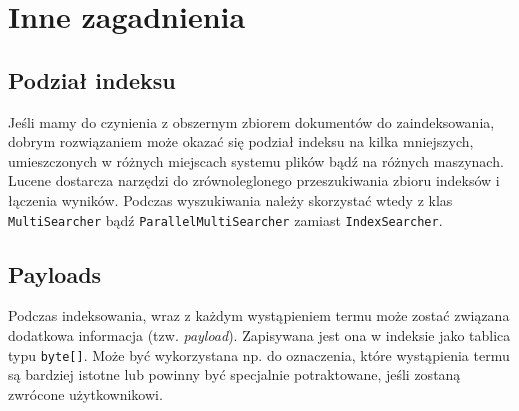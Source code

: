 \chapter{Inne zagadnienia}

\section{Podział indeksu}

Jeśli mamy do czynienia z obszernym zbiorem dokumentów do zaindeksowania, dobrym rozwiązaniem może okazać się podział indeksu na kilka mniejszych, umieszczonych w różnych miejscach systemu plików bądź na różnych maszynach. Lucene dostarcza narzędzi do zrównoleglonego przeszukiwania zbioru indeksów i łączenia wyników. Podczas wyszukiwania należy skorzystać wtedy z klas \texttt{MultiSearcher} bądź \texttt{ParallelMultiSearcher} zamiast \texttt{IndexSearcher}.

\section{Payloads}

Podczas indeksowania, wraz z każdym wystąpieniem termu może zostać związana dodatkowa informacja (tzw. \emph{payload}). Zapisywana jest ona w indeksie jako tablica typu \texttt{byte[]}. Może być wykorzystana np. do oznaczenia, które wystąpienia termu są bardziej istotne lub powinny być specjalnie potraktowane, jeśli zostaną zwrócone użytkownikowi.